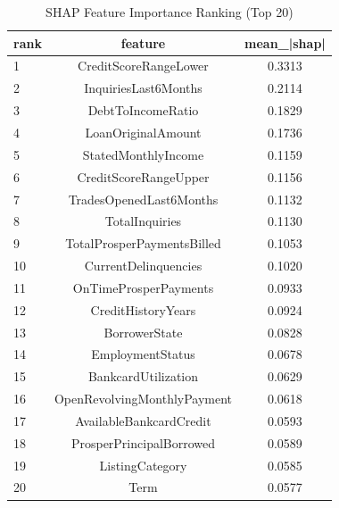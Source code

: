 \begin{table}
\centering
\caption{SHAP Feature Importance Ranking (Top 20)}
\label{tab:shap_ranking}
\begin{tabular}{lcc}
\toprule
rank & feature & mean_|shap| \\
\midrule
1 & CreditScoreRangeLower & 0.3313 \\
2 & InquiriesLast6Months & 0.2114 \\
3 & DebtToIncomeRatio & 0.1829 \\
4 & LoanOriginalAmount & 0.1736 \\
5 & StatedMonthlyIncome & 0.1159 \\
6 & CreditScoreRangeUpper & 0.1156 \\
7 & TradesOpenedLast6Months & 0.1132 \\
8 & TotalInquiries & 0.1130 \\
9 & TotalProsperPaymentsBilled & 0.1053 \\
10 & CurrentDelinquencies & 0.1020 \\
11 & OnTimeProsperPayments & 0.0933 \\
12 & CreditHistoryYears & 0.0924 \\
13 & BorrowerState & 0.0828 \\
14 & EmploymentStatus & 0.0678 \\
15 & BankcardUtilization & 0.0629 \\
16 & OpenRevolvingMonthlyPayment & 0.0618 \\
17 & AvailableBankcardCredit & 0.0593 \\
18 & ProsperPrincipalBorrowed & 0.0589 \\
19 & ListingCategory & 0.0585 \\
20 & Term & 0.0577 \\
\bottomrule
\end{tabular}
\end{table}
